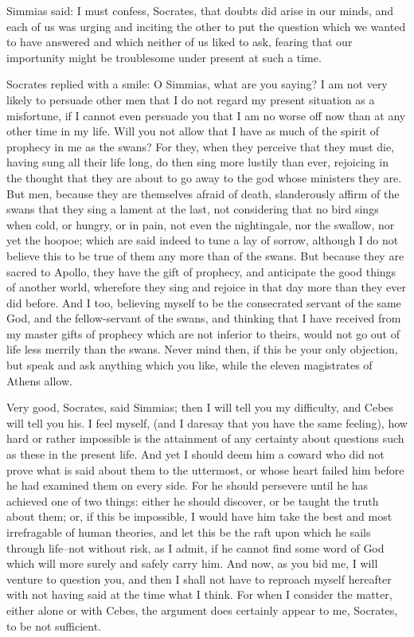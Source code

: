 Simmias said: I must confess, Socrates, that doubts did arise in our
minds, and each of us was urging and inciting the other to put the
question which we wanted to have answered and which neither of us liked
to ask, fearing that our importunity might be troublesome under present
at such a time.

Socrates replied with a smile: O Simmias, what are you saying? I am
not very likely to persuade other men that I do not regard my present
situation as a misfortune, if I cannot even persuade you that I am no
worse off now than at any other time in my life. Will you not allow that
I have as much of the spirit of prophecy in me as the swans? For they,
when they perceive that they must die, having sung all their life long,
do then sing more lustily than ever, rejoicing in the thought that
they are about to go away to the god whose ministers they are. But men,
because they are themselves afraid of death, slanderously affirm of the
swans that they sing a lament at the last, not considering that no bird
sings when cold, or hungry, or in pain, not even the nightingale, nor
the swallow, nor yet the hoopoe; which are said indeed to tune a lay of
sorrow, although I do not believe this to be true of them any more than
of the swans. But because they are sacred to Apollo, they have the gift
of prophecy, and anticipate the good things of another world, wherefore
they sing and rejoice in that day more than they ever did before. And I
too, believing myself to be the consecrated servant of the same God, and
the fellow-servant of the swans, and thinking that I have received from
my master gifts of prophecy which are not inferior to theirs, would not
go out of life less merrily than the swans. Never mind then, if this be
your only objection, but speak and ask anything which you like, while
the eleven magistrates of Athens allow.

Very good, Socrates, said Simmias; then I will tell you my difficulty,
and Cebes will tell you his. I feel myself, (and I daresay that you have
the same feeling), how hard or rather impossible is the attainment of
any certainty about questions such as these in the present life. And yet
I should deem him a coward who did not prove what is said about them to
the uttermost, or whose heart failed him before he had examined them
on every side. For he should persevere until he has achieved one of two
things: either he should discover, or be taught the truth about them;
or, if this be impossible, I would have him take the best and most
irrefragable of human theories, and let this be the raft upon which he
sails through life--not without risk, as I admit, if he cannot find some
word of God which will more surely and safely carry him. And now, as
you bid me, I will venture to question you, and then I shall not have to
reproach myself hereafter with not having said at the time what I think.
For when I consider the matter, either alone or with Cebes, the argument
does certainly appear to me, Socrates, to be not sufficient.

